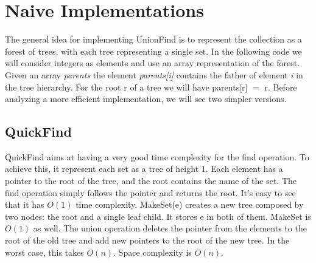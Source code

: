 \documentclass{article}
\begin{document}
\section{Naive Implementations}
The general idea for implementing UnionFind is to represent the collection as a forest of trees, with each tree representing a single set. 
In the following code we will  consider integers as elements and use an array representation of the forest.
Given an array \emph{parents} the element \emph{parents[i]} contains the father of element \emph{i} in the tree hierarchy. For the root
r of a tree we will have parents[r] $=$ r. Before analyzing a more efficient implementation, we will see two simpler versions.

\subsection{QuickFind} \label{QF}
QuickFind aims at having a very good time complexity for the find operation. To achieve this, it represent each set as a tree of height 1. Each element
has a pointer to the root of the tree,  and the root contains the name of the set. The find operation simply follows the pointer and returns the root. It's easy to see that it has $O(1)$ time complexity. MakeSet(e) creates a new tree composed by two nodes: the root and a single leaf child. It stores e in both of them. MakeSet is $O(1)$ as well. The union operation deletes the pointer from the elements to the root of the old tree
and add new pointers to the root of the new tree. In the worst case, this takes $O(n)$. Space complexity is $O(n)$. 
\end{document}
